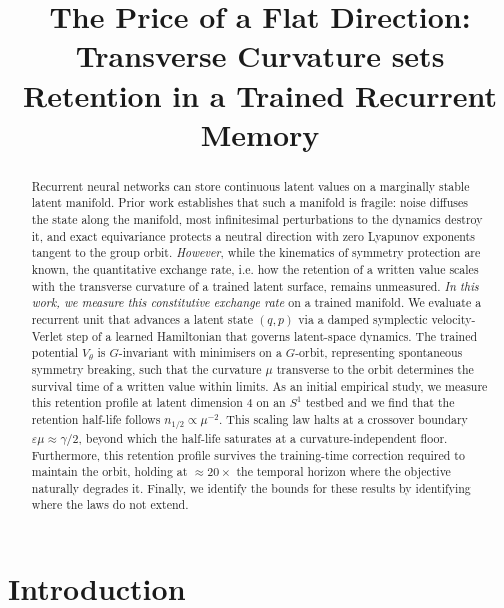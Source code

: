 \documentclass{article}
\title{The Price of a Flat Direction:\\ Transverse Curvature sets Retention in a Trained Recurrent Memory}
\author{}
\begin{document}
\maketitle
\begin{abstract}
Recurrent neural networks can store continuous latent values on a marginally stable latent manifold. Prior work establishes that such a manifold is fragile: noise diffuses the state along the manifold, most infinitesimal perturbations to the dynamics destroy it, and exact equivariance protects a neutral direction with zero Lyapunov exponents tangent to the group orbit. \emph{However}, while the kinematics of symmetry protection are known, the quantitative exchange rate, i.e. how the retention of a written value scales with the transverse curvature of a trained latent surface, remains unmeasured. \emph{In this work, we measure this constitutive exchange rate} on a trained manifold. We evaluate a recurrent unit that advances a latent state $(q,p)$ via a damped symplectic velocity-Verlet step of a learned Hamiltonian that governs latent-space dynamics. The trained potential $V_\theta$ is $G$-invariant with minimisers on a $G$-orbit, representing spontaneous symmetry breaking, such that the curvature $\mu$ transverse to the orbit determines the survival time of a written value within limits. As an initial empirical study, we measure this retention profile at latent dimension $4$ on an $S^1$ testbed and we find that the retention half-life follows $n_{1/2}\propto\mu^{-2}$. This scaling law halts at a crossover boundary $\varepsilon\mu\approx\gamma/2$, beyond which the half-life saturates at a curvature-independent floor. Furthermore, this retention profile survives the training-time correction required to maintain the orbit, holding at $\approx20\times$ the temporal horizon where the objective naturally degrades it. Finally, we identify the bounds for these results by identifying where the laws do not extend.
\end{abstract}

\section{Introduction}\label{sec:intro}
\end{document}
